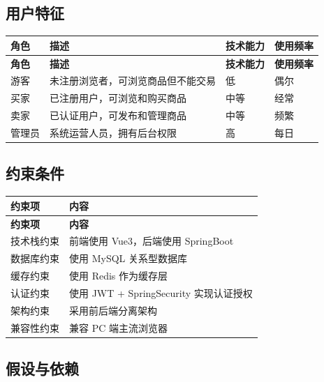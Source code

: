 \documentclass[12pt,a4paper,UTF8]{ctexart}
\begin{document}
\subsection{用户特征}

\begin{longtable}{p{}|p{}|p{}|p{}}
    \toprule
    \textbf{角色} & \textbf{描述} & \textbf{技术能力} & \textbf{使用频率} \\
    \midrule
    \endfirsthead
    \toprule
    \textbf{角色} & \textbf{描述} & \textbf{技术能力} & \textbf{使用频率} \\
    \midrule
    \endhead
    \bottomrule
    \endfoot

    游客 & 未注册浏览者，可浏览商品但不能交易 & 低 & 偶尔 \\
    买家 & 已注册用户，可浏览和购买商品 & 中等 & 经常 \\
    卖家 & 已认证用户，可发布和管理商品 & 中等 & 频繁 \\
    管理员 & 系统运营人员，拥有后台权限 & 高 & 每日 \\
\end{longtable}

\subsection{约束条件}

\begin{longtable}{p{}|p{}}
    \toprule
    \textbf{约束项} & \textbf{内容} \\
    \midrule
    \endfirsthead
    \toprule
    \textbf{约束项} & \textbf{内容} \\
    \midrule
    \endhead
    \bottomrule
    \endfoot

    技术栈约束 & 前端使用 Vue3，后端使用 SpringBoot \\
    数据库约束 & 使用 MySQL 关系型数据库 \\
    缓存约束 & 使用 Redis 作为缓存层 \\
    认证约束 & 使用 JWT + SpringSecurity 实现认证授权 \\
    架构约束 & 采用前后端分离架构 \\
    兼容性约束 & 兼容 PC 端主流浏览器 \\
\end{longtable}

\subsection{假设与依赖}
\end{document}
